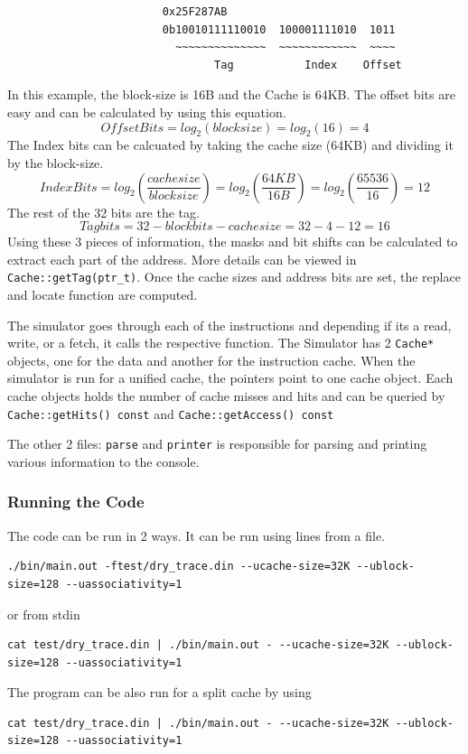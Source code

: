 \documentclass{article}
\begin{document}
            \begin{center}
            \begin{verbatim}
                        0x25F287AB
                        0b10010111110010  100001111010  1011
                          ~~~~~~~~~~~~~~  ~~~~~~~~~~~~  ~~~~
                                Tag           Index    Offset
            \end{verbatim}
            \end{center}
            In this example, the block-size is 16B and the Cache is 64KB. The offset bits are easy and can be calculated by using this equation.
            \[ Offset Bits = log_2(blocksize) = log_2(16) = 4  \]
            The Index bits can be calcuated by taking the cache size (64KB) and dividing it by the block-size.
            \[ Index Bits = log_2\left(\frac{cachesize}{blocksize}\right) = log_2\left(\frac{64KB}{16B}\right) = log_2\left(\frac{65536}{16}\right) = 12 \]
            The rest of the 32 bits are the tag.
            \[ Tag bits = 32 - blockbits - cachesize = 32 - 4 - 12 = 16 \]
            Using these 3 pieces of information, the masks and bit shifts can be calculated to extract each part of the address. More details can be viewed in \verb|Cache::getTag(ptr_t)|. Once the cache sizes and address bits are set, the replace and locate function are computed.
            \par
            The simulator goes through each of the instructions and depending if its a read, write, or a fetch, it calls the respective function. The Simulator has 2 \verb|Cache*| objects, one for the data and another for the instruction cache. When the simulator is run for a unified cache, the pointers point to one cache object. Each cache objects holds the number of cache misses and hits and can be queried by \verb|Cache::getHits() const| and \verb|Cache::getAccess() const|
            \par
            The other 2 files: \verb|parse| and \verb|printer| is responsible for parsing and printing various information to the console.
        \subsubsection{Running the Code}
            The code can be run in 2 ways. It can be run using lines from a file.
            \begin{lstlisting}
./bin/main.out -ftest/dry_trace.din --ucache-size=32K --ublock-size=128 --uassociativity=1
            \end{lstlisting}
            or from stdin
            \begin{lstlisting}
cat test/dry_trace.din | ./bin/main.out - --ucache-size=32K --ublock-size=128 --uassociativity=1
            \end{lstlisting}
            The program can be also run for a split cache by using
            \begin{lstlisting}
cat test/dry_trace.din | ./bin/main.out - --ucache-size=32K --ublock-size=128 --uassociativity=1
            \end{lstlisting}
\end{document}
